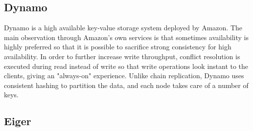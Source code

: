 \subsection{Dynamo}
Dynamo is a high available key-value storage system deployed by Amazon. The main observation through Amazon's own services is that sometimes availability is highly preferred so that it is possible to sacrifice strong consistency for high availability. In order to further increase write throughput, conflict resolution is executed during read instead of write so that write operations look instant to the clients, giving an "always-on" experience. Unlike chain replication, Dynamo uses consistent hashing to partition the data, and each node takes care of a number of keys.

\subsection{Eiger}


\label{sec:related}

